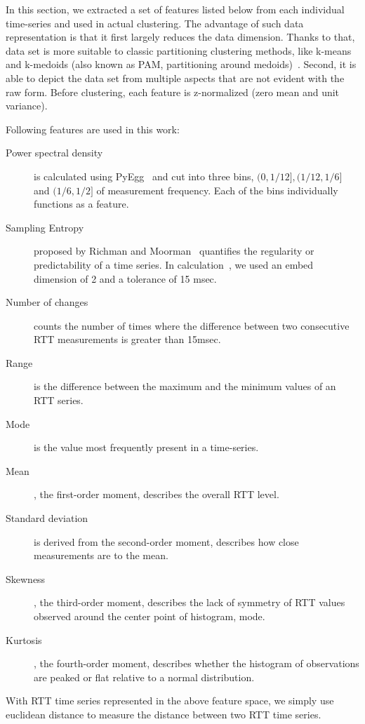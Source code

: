 In this section, we extracted a set of features listed below from each individual time-series and used in actual clustering. 
The advantage of such data representation is that it first largely reduces the data dimension. Thanks to that, data set is more suitable to classic partitioning clustering methods, like k-means and k-medoids (also known as PAM, partitioning around medoids)~\cite{Lin2003}.
Second, it is able to depict the data set from multiple aspects that are not evident with the raw form. 
Before clustering, each feature is z-normalized (zero mean and unit variance).

Following features are used in this work:
\begin{description}
\item[Power spectral density] is calculated using PyEgg~\cite{Bao2011} and cut into three bins, $(0, 1/12], (1/12, 1/6]$ and $(1/6, 1/2]$ of measurement frequency. Each of the bins individually functions as a feature.
\item[Sampling Entropy] proposed by Richman and Moorman~\cite{Richman2000} quantifies the regularity or predictability of a time series. In calculation~\cite{Bao2011}, we used an embed dimension of 2 and a tolerance of 15 msec.
\item[Number of changes] counts the number of times where the difference between two consecutive RTT measurements is greater than 15msec. %
\item[Range] is the difference between the maximum and the minimum values of an RTT series.
\item[Mode] is the value most frequently present in a time-series.
\item[Mean], the first-order moment, describes the overall RTT level.
\item[Standard deviation] is derived from the second-order moment, describes how close measurements are to the mean.
\item[Skewness], the third-order moment, describes the lack of symmetry of RTT values observed around the center point of histogram, mode.
\item[Kurtosis], the fourth-order moment, describes whether the histogram of observations are peaked or flat relative to a normal distribution.
\end{description}
With RTT time series represented in the above feature space, we simply use euclidean distance to measure the distance between two RTT time series.

